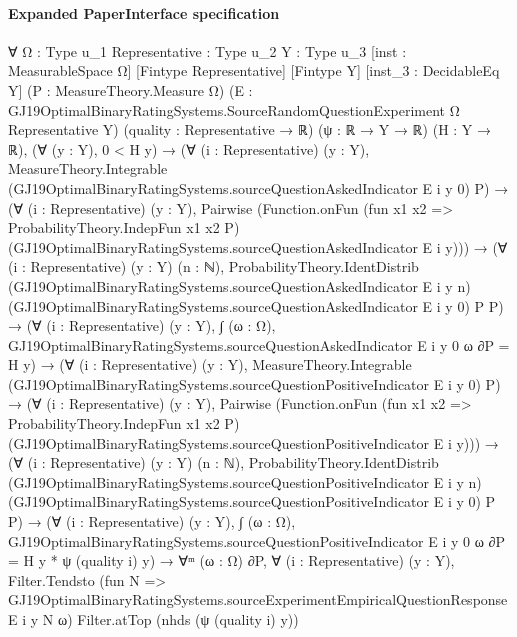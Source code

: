 \documentclass[10pt]{article}
\begin{document}
\paragraph{Expanded PaperInterface specification}
\begin{ReviewVerbatim}
∀ {Ω : Type u_1} {Representative : Type u_2} {Y : Type u_3} [inst : MeasurableSpace Ω] [Fintype Representative]
  [Fintype Y] [inst_3 : DecidableEq Y] (P : MeasureTheory.Measure Ω)
  (E : GJ19OptimalBinaryRatingSystems.SourceRandomQuestionExperiment Ω Representative Y) (quality : Representative → ℝ)
  (ψ : ℝ → Y → ℝ) (H : Y → ℝ),
  (∀ (y : Y), 0 < H y) →
    (∀ (i : Representative) (y : Y),
        MeasureTheory.Integrable (GJ19OptimalBinaryRatingSystems.sourceQuestionAskedIndicator E i y 0) P) →
      (∀ (i : Representative) (y : Y),
          Pairwise
            (Function.onFun (fun x1 x2 => ProbabilityTheory.IndepFun x1 x2 P)
              (GJ19OptimalBinaryRatingSystems.sourceQuestionAskedIndicator E i y))) →
        (∀ (i : Representative) (y : Y) (n : ℕ),
            ProbabilityTheory.IdentDistrib (GJ19OptimalBinaryRatingSystems.sourceQuestionAskedIndicator E i y n)
              (GJ19OptimalBinaryRatingSystems.sourceQuestionAskedIndicator E i y 0) P P) →
          (∀ (i : Representative) (y : Y),
              ∫ (ω : Ω), GJ19OptimalBinaryRatingSystems.sourceQuestionAskedIndicator E i y 0 ω ∂P = H y) →
            (∀ (i : Representative) (y : Y),
                MeasureTheory.Integrable (GJ19OptimalBinaryRatingSystems.sourceQuestionPositiveIndicator E i y 0) P) →
              (∀ (i : Representative) (y : Y),
                  Pairwise
                    (Function.onFun (fun x1 x2 => ProbabilityTheory.IndepFun x1 x2 P)
                      (GJ19OptimalBinaryRatingSystems.sourceQuestionPositiveIndicator E i y))) →
                (∀ (i : Representative) (y : Y) (n : ℕ),
                    ProbabilityTheory.IdentDistrib
                      (GJ19OptimalBinaryRatingSystems.sourceQuestionPositiveIndicator E i y n)
                      (GJ19OptimalBinaryRatingSystems.sourceQuestionPositiveIndicator E i y 0) P P) →
                  (∀ (i : Representative) (y : Y),
                      ∫ (ω : Ω), GJ19OptimalBinaryRatingSystems.sourceQuestionPositiveIndicator E i y 0 ω ∂P =
                        H y * ψ (quality i) y) →
                    ∀ᵐ (ω : Ω) ∂P,
                      ∀ (i : Representative) (y : Y),
                        Filter.Tendsto
                          (fun N => GJ19OptimalBinaryRatingSystems.sourceExperimentEmpiricalQuestionResponse E i y N ω)
                          Filter.atTop (nhds (ψ (quality i) y))
\end{ReviewVerbatim}
\end{document}
